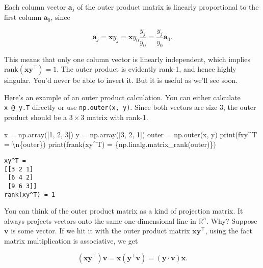 \documentclass[
  letterpaper,
  DIV=11,
  numbers=noendperiod]{scrreprt}
\newenvironment{Shaded}{\begin{snugshade}}{\end{snugshade}}
\newcommand{\BuiltInTok}[1]{\textcolor[rgb]{0.00,0.23,0.31}{#1}}
\newcommand{\CharTok}[1]{\textcolor[rgb]{0.13,0.47,0.30}{#1}}
\newcommand{\DecValTok}[1]{\textcolor[rgb]{0.68,0.00,0.00}{#1}}
\newcommand{\NormalTok}[1]{\textcolor[rgb]{0.00,0.23,0.31}{#1}}
\newcommand{\OperatorTok}[1]{\textcolor[rgb]{0.37,0.37,0.37}{#1}}
\newcommand{\SpecialCharTok}[1]{\textcolor[rgb]{0.37,0.37,0.37}{#1}}
\newcommand{\SpecialStringTok}[1]{\textcolor[rgb]{0.13,0.47,0.30}{#1}}
\begin{document}
Each column vector \(\mathbf{a}_j\) of the outer product matrix is
linearly proportional to the first column \(\mathbf{a}_0\), since

\[\mathbf{a}_j = \mathbf{x} y_j = \mathbf{x} y_0 \frac{y_j}{y_0} = \frac{y_j}{y_0} \mathbf{a}_0.\]

This means that only one column vector is linearly independent, which
implies \(\text{rank}(\mathbf{x} \mathbf{y}^\top)=1\). The outer product
is evidently rank-1, and hence highly singular. You'd never be able to
invert it. But it is useful as we'll see soon.

Here's an example of an outer product calculation. You can either
calculate \texttt{x\ @\ y.T} directly or use \texttt{np.outer(x,\ y)}.
Since both vectors are size \(3\), the outer product should be a
\(3 \times 3\) matrix with rank-1.

\begin{Shaded}
\begin{Highlighting}[]
\NormalTok{x }\OperatorTok{=}\NormalTok{ np.array([}\DecValTok{1}\NormalTok{, }\DecValTok{2}\NormalTok{, }\DecValTok{3}\NormalTok{])}
\NormalTok{y }\OperatorTok{=}\NormalTok{ np.array([}\DecValTok{3}\NormalTok{, }\DecValTok{2}\NormalTok{, }\DecValTok{1}\NormalTok{])}
\NormalTok{outer }\OperatorTok{=}\NormalTok{ np.outer(x, y)}
\BuiltInTok{print}\NormalTok{(}\SpecialStringTok{f\textquotesingle{}xy\^{}T = }\CharTok{\textbackslash{}n}\SpecialCharTok{\{}\NormalTok{outer}\SpecialCharTok{\}}\SpecialStringTok{\textquotesingle{}}\NormalTok{)}
\BuiltInTok{print}\NormalTok{(}\SpecialStringTok{f\textquotesingle{}rank(xy\^{}T) = }\SpecialCharTok{\{}\NormalTok{np}\SpecialCharTok{.}\NormalTok{linalg}\SpecialCharTok{.}\NormalTok{matrix\_rank(outer)}\SpecialCharTok{\}}\SpecialStringTok{\textquotesingle{}}\NormalTok{)}
\end{Highlighting}
\end{Shaded}

\begin{verbatim}
xy^T = 
[[3 2 1]
 [6 4 2]
 [9 6 3]]
rank(xy^T) = 1
\end{verbatim}

You can think of the outer product matrix as a kind of projection
matrix. It always projects vectors onto the same one-dimensional line in
\(\mathbb{R}^n\). Why? Suppose \(\mathbf{v}\) is some vector. If we hit
it with the outer product matrix \(\mathbf{x} \mathbf{y}^\top\), using
the fact matrix multiplication is associative, we get

\[(\mathbf{x} \mathbf{y}^\top) \mathbf{v} = \mathbf{x} (\mathbf{y}^\top \mathbf{v}) = (\mathbf{y} \cdot \mathbf{v}) \mathbf{x}.\]
\end{document}
